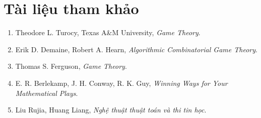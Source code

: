 \documentclass[11pt]{article}
\begin{document}
\section*{Tài liệu tham khảo}

\begin{enumerate}
  \item Theodore L. Turocy, Texas A\&M University, \emph{Game Theory}.
  \item Erik D. Demaine, Robert A. Hearn, \emph{Algorithmic Combinatorial Game Theory}.
  \item Thomas S. Ferguson, \emph{Game Theory}.
  \item E. R. Berlekamp, J. H. Conway, R. K. Guy, \emph{Winning Ways for Your Mathematical Plays}.
  \item Liu Rujia, Huang Liang, \emph{Nghệ thuật thuật toán và thi tin học}.
\end{enumerate}
\end{document}
